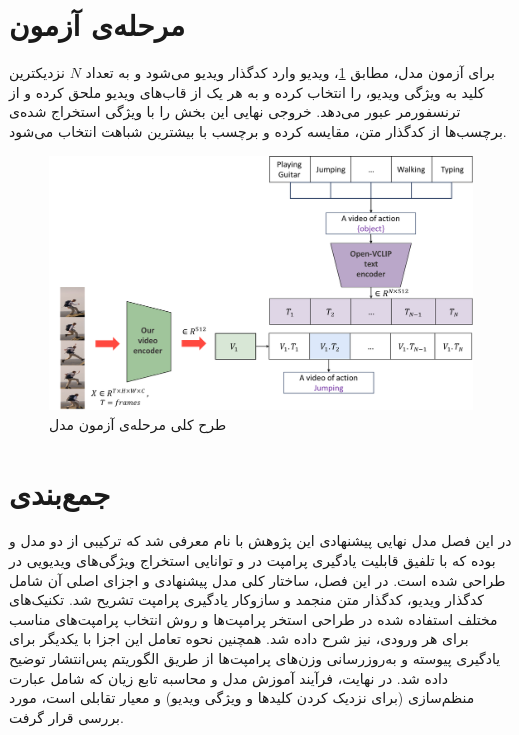 \section{مرحله‌ی آزمون }
برای آزمون مدل، مطابق \cref{fig.35}، ویدیو وارد کدگذار ویدیو می‌شود و به تعداد $N$ نزدیکترین کلید به ویژگی ویدیو، را انتخاب کرده و به هر یک از قاب‌های ویدیو ملحق کرده و از ترنسفورمر عبور می‌دهد. خروجی نهایی این بخش را با ویژگی استخراج شده‌ی برچسب‌ها از کدگذار متن، مقایسه کرده و برچسب با بیشترین شباهت انتخاب می‌شود.
‌\begin{figure}
	\centering\includegraphics[scale=.48]{Images/Chapter3/test_phase.png}
	\caption[طرح کلی مرحله‌ی آزمون مدل ]{طرح کلی مرحله‌ی آزمون مدل }
	\label{fig.35}
\end{figure}
\section{جمع‌بندی}
در این فصل مدل نهایی پیشنهادی این پژوهش با نام  معرفی شد که ترکیبی از دو مدل  و  بوده که با تلفیق قابلیت یادگیری پرامپت در  و توانایی استخراج ویژگی‌های ویدیویی در  طراحی شده است. در این فصل، ساختار کلی مدل پیشنهادی و اجزای اصلی آن شامل کدگذار ویدیو، کدگذار متن منجمد و سازوکار یادگیری پرامپت تشریح شد. تکنیک‌های مختلف استفاده شده در طراحی استخر پرامپت‌ها و روش انتخاب پرامپت‌های مناسب برای هر ورودی، نیز شرح داده شد. همچنین نحوه تعامل این اجزا با یکدیگر برای یادگیری پیوسته و به‌روزرسانی وزن‌های پرامپت‌ها از طریق الگوریتم پس‌انتشار توضیح داده شد. در نهایت، فرآیند آموزش مدل و محاسبه تابع زیان که شامل عبارت منظم‌سازی (برای نزدیک کردن کلیدها و ویژگی ویدیو) و معیار تقابلی است، مورد بررسی قرار گرفت.



